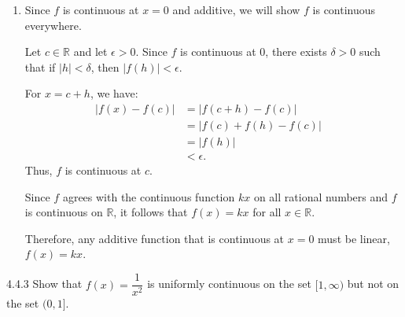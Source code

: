 {\begin{enumerate}
        Now, observe that for \(p,q \in \Z\) with \(q \ne 0\), we have:
        \[
            f\left(\underbrace{\dfrac{p}{q} + \dfrac{p}{q} + \cdots + \dfrac{p}{q}}_{q\text{ times}}\right) = f(p).
        \]
        Similarly, by the additive condition (\(q\) times on each side): 
        \[
            f\left(\dfrac{p}{q} + \dfrac{p}{q} + \cdots + \dfrac{p}{q}\right) = f\left(\dfrac{p}{q}\right) + f\left(\dfrac{p}{q}\right) + \cdots + f\left(\dfrac{p}{q}\right).
        \]
        This is equivalent to:
        \[
            q \cdot f\left(\dfrac{p}{q}\right) = f(p).
        \]
        Therefore, 
        \[
            f\left(\dfrac{p}{q}\right) = \dfrac{1}{q} f(p) 
        \]
        Putting everything together, we let \(r = \dfrac{p}{q}\). Then,
        \begin{align*}
            f\left( \dfrac{p}{q} \right) &= \dfrac{1}{q} f(p) \\
            &= \dfrac{1}{q} (kp) \quad (\text{from (1)})\\
            &= k \left( \dfrac{p}{q} \right) \\
            &= kr.
        \end{align*}
        Thus, \(f(r) = kr\) for any rational number \(r\).
        \item Since \(f\) is continuous at \(x = 0\) and additive, we will show \(f\) is continuous everywhere.

        Let \(c \in \mathbb{R}\) and let \(\epsilon > 0\). Since \(f\) is continuous at \(0\), there exists \(\delta > 0\) such that if \(|h| < \delta\), then \(|f(h)| < \epsilon\).

        For \(x = c + h\), we have:
        \begin{align*}
            |f(x) - f(c)| &= |f(c + h) - f(c)| \\
            &= |f(c) + f(h) - f(c)| \quad \\
            &= |f(h)| \\
            &< \epsilon.
        \end{align*}
        Thus, \(f\) is continuous at \(c\).

        Since \(f\) agrees with the continuous function \(kx\) on all rational numbers and \(f\) is continuous on \(\mathbb{R}\), it follows that \(f(x) = kx\) for all \(x \in \mathbb{R}\).

        Therefore, any additive function that is continuous at \(x = 0\) must be linear, \(f(x) = kx\).
    \end{enumerate}
}
\newpage
\begin{exercise}
    {4.4.3} Show that \(f(x) = \dfrac{1}{x^2}\) is uniformly continuous on the set \([1, \infty)\) but not on the set \((0, 1]\).
\end{exercise}

